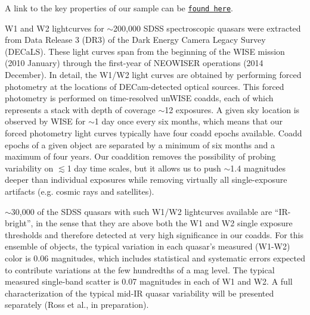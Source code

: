 \documentclass{emulateapj}
\begin{document}
%

%
%
%
%
%

A link to the key properties of our sample can be
\href{http://portal.nersc.gov/project/cosmo/temp/ameisner/qso\_pages\_v01/}
{\tt found here}.

W1 and W2 lightcurves for $\sim$200,000 SDSS spectroscopic quasars were 
extracted from Data Release 3 (DR3) of the Dark Energy Camera Legacy Survey 
(DECaLS). These light curves span from the beginning of the WISE mission 
(2010 January) through the first-year of NEOWISER operations 
(2014 December). In detail, the W1/W2 light curves are obtained by performing 
forced photometry at the locations of DECam-detected optical sources. This 
forced photometry is performed on time-resolved unWISE coadds, each of which 
represents a stack with depth of coverage $\sim$12 exposures. A given sky 
location is observed by 
WISE for $\sim$1 day once every six months, which means that our forced 
photometry 
light curves typically have four coadd epochs available. Coadd epochs of a
given object are separated by a minimum of six months and a maximum of
four years. Our coaddition removes the possibility of probing variability on 
$\lesssim$1 day time scales, but it allows us to push $\sim$1.4 magnitudes 
deeper than individual exposures while removing virtually all single-exposure 
artifacts (e.g. cosmic rays and satellites).

$\sim$30,000 of the SDSS quasars with such W1/W2 lightcurves available are 
``IR-bright'', in the sense that they are above both the W1 and W2 single 
exposure thresholds and therefore detected at very high significance in our 
coadds. For this ensemble of objects, the typical variation in each quasar's 
measured (W1-W2) color is 0.06 magnitudes, which includes 
statistical and systematic errors expected to contribute variations
at the few hundredths of a mag level. The typical measured single-band scatter 
is 0.07 magnitudes in each of W1 and W2. A full characterization of
the typical mid-IR quasar variability will be presented separately 
(Ross et al., in preparation).
\end{document}
